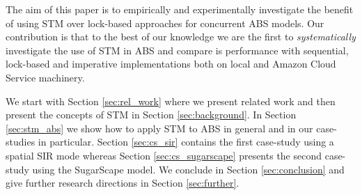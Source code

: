 The aim of this paper is to empirically and experimentally investigate the benefit of using STM over lock-based approaches for concurrent ABS models. Our contribution is that to the best of our knowledge we are the first to \textit{systematically} investigate the use of STM in ABS and compare is performance with sequential, lock-based and imperative implementations both on local and Amazon Cloud Service machinery.

We start with Section \ref{sec:rel_work} where we present related work and then present the concepts of STM in Section \ref{sec:background}. In Section \ref{sec:stm_abs} we show how to apply STM to ABS in general and in our case-studies in particular. Section \ref{sec:cs_sir} contains the first case-study using a spatial SIR mode whereas Section \ref{sec:cs_sugarscape} presents the second case-study using the SugarScape model. We conclude in Section \ref{sec:conclusion} and give further research directions in Section \ref{sec:further}.